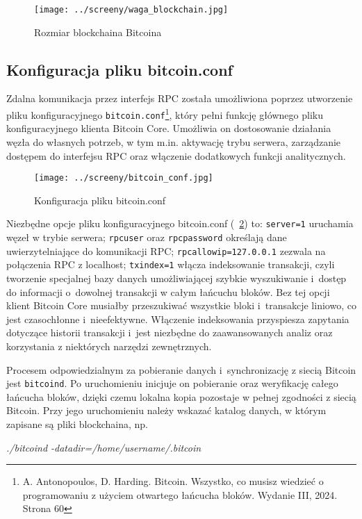 \documentclass[12pt,a4paper]{report}
\theoremstyle{definition} %
\begin{document}
	\begin{figure}[H]
	    \centering
	    \texttt{[image: ../screeny/waga\_blockchain.jpg]} 
	    \caption{Rozmiar blockchaina Bitcoina}
	    \label{fig:rozmiarBTC}
	\end{figure}

	\subsection{Konfiguracja pliku bitcoin.conf}
	\hspace*{\parindent}Zdalna komunikacja przez interfejs RPC została umożliwiona poprzez utworzenie pliku konfiguracyjnego \texttt{bitcoin.conf}\footnote{A. Antonopoulos, D. Harding. Bitcoin. Wszystko, co musisz wiedzieć o programowaniu z użyciem otwartego łańcucha bloków. Wydanie III, 2024. Strona 60}, który pełni funkcję głównego pliku konfiguracyjnego klienta Bitcoin Core. Umożliwia on dostosowanie działania węzła do własnych potrzeb, w tym m.in. aktywację trybu serwera, zarządzanie dostępem do interfejsu RPC oraz włączenie dodatkowych funkcji analitycznych.
	
	\begin{figure}[H]
	    \centering
	    \texttt{[image: ../screeny/bitcoin\_conf.jpg]} 
	    \caption{Konfiguracja pliku bitcoin.conf}
	    \label{fig:bitcoinCONF}
	\end{figure}
	
	Niezbędne opcje pliku konfiguracyjnego bitcoin.conf (\figurename~\ref{fig:bitcoinCONF}) to: \texttt{server=1} uruchamia węzeł w trybie serwera; \texttt{rpcuser} oraz \texttt{rpcpassword} określają dane uwierzytelniające do komunikacji RPC; \texttt{rpcallowip=127.0.0.1} zezwala na połączenia RPC z localhost; \texttt{txindex=1} włącza 				indeksowanie transakcji, czyli tworzenie specjalnej bazy danych umożliwiającej szybkie wyszukiwanie i~dostęp do informacji o~dowolnej transakcji w całym łańcuchu bloków. Bez tej opcji klient Bitcoin Core musiałby przeszukiwać wszystkie bloki i~transakcje liniowo, co jest czasochłonne i~nieefektywne. Włączenie indeksowania przyspiesza zapytania dotyczące historii transakcji i~jest niezbędne do zaawansowanych analiz oraz korzystania z niektórych narzędzi zewnętrznych.

	Procesem odpowiedzialnym za pobieranie danych i~synchronizację z siecią Bitcoin jest \texttt{bitcoind}.  Po uruchomieniu inicjuje on pobieranie oraz weryfikację całego łańcucha bloków, dzięki czemu lokalna kopia pozostaje w pełnej zgodności z siecią Bitcoin. Przy jego uruchomieniu należy wskazać katalog danych, w którym zapisane są pliki blockchaina, np.
	\begin{center}
	\textit{./bitcoind -datadir=/home/username/.bitcoin}
	\end{center}
\end{document}
